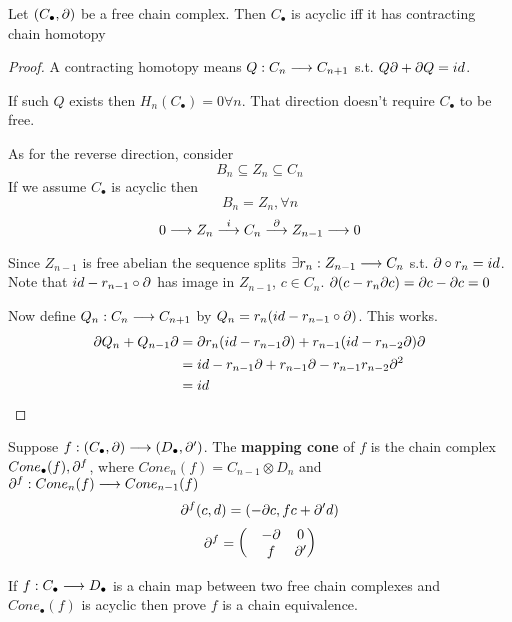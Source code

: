 \documentclass[11pt]{book} %
\begin{document}
\begin{exr}\label{chap11exr:free_acyclic_contracting_chain_homotopy}
Let $(C_\bullet,{\partial})$ be a free chain complex. Then $C_\bullet$ is acyclic iff it  has contracting chain homotopy
\end{exr}
\begin{proof}
A contracting homotopy means $Q:C_n\longrightarrow C_{n+1}$ s.t. $Q{\partial}+{\partial} Q=id$. 

If such $Q$ exists then $H_n(C_\bullet)=0\forall n$. That direction doesn't require $C_\bullet$ to be free.

As for the reverse direction, consider
$$
B_n\subseteq Z_n\subseteq C_n
$$
If we assume $C_\bullet$ is acyclic then
$$
B_n=Z_n,\forall n
$$ 
$$
0\longrightarrow Z_n \overset{i}{\longrightarrow} C_n\overset{{\partial}}{\longrightarrow}Z_{n-1}\longrightarrow 0
$$

Since $Z_{n-1}$ is free abelian  the sequence splits $\exists r_n:Z_{n-1}\longrightarrow C_n$ s.t. ${\partial}\circ r_n=id$. Note that $id- r_{n-1}\circ {\partial}$ has image in $Z_{n-1}$, $c\in C_n$. ${\partial}(c-r_n{\partial} c)={\partial} c-{\partial} c=0$

Now define 
$Q_n:C_n\longrightarrow C_{n+1}$ by $Q_{n}=r_n (id-r_{n-1}\circ{\partial})$. This works.
$$
\begin{aligned}
{\partial} Q_n +Q_{n-1}{\partial}
&={\partial} r_n (id -r_{n-1}{\partial})+r_{n-1}( id-r_{n-2}{\partial} ){\partial}\\
&=id -r_{n-1}{\partial}+r_{n-1}{\partial} -r_{n-1}r_{n-2}{\partial}^2\\
&=id
\end{aligned}
$$
\end{proof}
\begin{definition}
Suppose $f:(C_\bullet,{\partial})\longrightarrow (D_\bullet,{\partial}')$. The \textbf{mapping cone } of $f$ is the chain complex $Cone_\bullet(f),{\partial}^f$, where $Cone_n(f)=C_{n-1}\otimes D_n$ and 
${\partial}^f:Cone_n(f)\longrightarrow Cone_{n-1}(f)$
$$
{\partial}^f(c,d)=(-{\partial} c,f c+{\partial}' d)
$$
$$
{\partial}^f=
\begin{pmatrix}
&-{\partial} & 0\\
& f &{\partial}'
\end{pmatrix}
$$
\end{definition}
\begin{exr}\label{chap11exr:acyclic_mapping_cone_chain_equivalence}
If $f:C_\bullet\longrightarrow D_\bullet$ is a chain map between two free chain complexes and $Cone_\bullet(f)$ is acyclic then prove $f$ is  a chain equivalence.
\end{exr}
\end{document}
